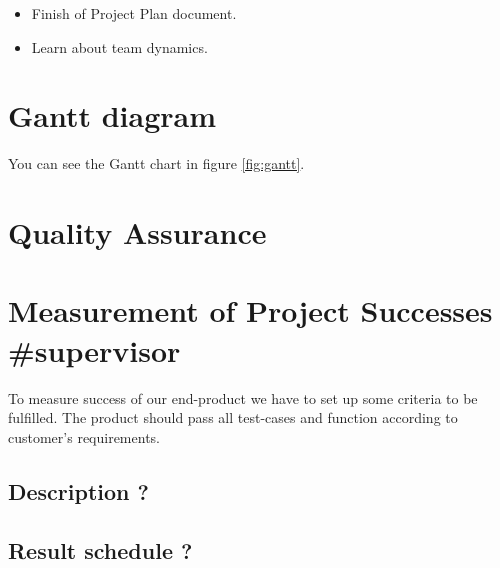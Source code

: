 \begin{itemize}
	\item Finish of Project Plan document.
	\item Learn about team dynamics.
\end{itemize}

\section{Gantt diagram}
You can see the Gantt chart in figure \ref{fig:gantt}.


\section{Quality Assurance}

\section{Measurement of Project Successes \#supervisor}
To measure success of our end-product we have to set up some criteria to be fulfilled. The product should pass all test-cases and function according to customer's requirements.

\subsection{Description ?}
\subsection{Result schedule ?}
